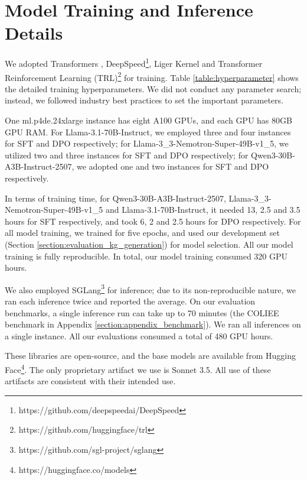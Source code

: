 \section{Model Training and Inference Details}
\label{section:hyperparameter}

We adopted Transformers \cite{DBLP:conf/emnlp/WolfDSCDMCRLFDS20}, DeepSpeed\footnote{https://github.com/deepspeedai/DeepSpeed}, Liger Kernel \cite{DBLP:journals/corr/abs-2410-10989} and Transformer Reinforcement Learning (TRL)\footnote{https://github.com/huggingface/trl} for training. Table \ref{table:hyperparameter} shows the detailed training hyperparameters. We did not conduct any parameter search; instead, we followed industry best practices to set the important parameters.

One ml.p4de.24xlarge instance has eight A100 GPUs, and each GPU has 80GB GPU RAM. For Llama-3.1-70B-Instruct, we employed three and four instances for SFT and DPO respectively; for Llama-3\_3-Nemotron-Super-49B-v1\_5, we utilized two and three instances for SFT and DPO respectively; for Qwen3-30B-A3B-Instruct-2507, we adopted one and two instances for SFT and DPO respectively.

In terms of training time, for Qwen3-30B-A3B-Instruct-2507, Llama-3\_3-Nemotron-Super-49B-v1\_5 and Llama-3.1-70B-Instruct, it needed 13, 2.5 and 3.5 hours for SFT respectively, and took 6, 2 and 2.5 hours for DPO respectively. For all model training, we trained for five epochs, and used our development set (Section \ref{section:evaluation_kg_generation}) for model selection. All our model training is fully reproducible. In total, our model training consumed 320 GPU hours.

We also employed SGLang\footnote{https://github.com/sgl-project/sglang} for inference; due to its non-reproducible nature, we ran each inference twice and reported the average. On our evaluation benchmarks, a single inference run can take up to 70 minutes (the COLIEE benchmark in Appendix \ref{section:appendix_benchmark}). We ran all inferences on a single instance. All our evaluations consumed a total of 480 GPU hours.

These libraries are open-source, and the base models are available from Hugging Face\footnote{https://huggingface.co/models}. The only proprietary artifact we use is Sonnet 3.5. All use of these artifacts are consistent with their intended use.

